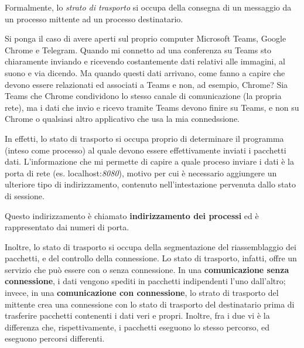             Formalmente, lo \textit{strato di trasporto} si occupa della consegna di un messaggio da un processo mittente ad un processo destinatario. 
            
            \vspace{3mm}
            
            Si ponga il caso di avere aperti sul proprio computer Microsoft Teams, Google Chrome e Telegram. Quando mi connetto ad una conferenza su Teams sto chiaramente inviando e ricevendo costantemente dati relativi alle immagini, al suono e via dicendo. Ma quando questi dati arrivano, come fanno a capire che devono essere relazionati ed associati a Teams e non, ad esempio, Chrome? Sia Teams che Chrome condividono lo stesso canale di comunicazione (la propria rete), ma i dati che invio e ricevo tramite Teams devono finire su Teams, e non su Chrome o qualsiasi altro applicativo che usa la mia connedssione.
            
            \vspace{3mm}
            
            In effetti, lo stato di trasporto si occupa proprio di determinare il programma (inteso come processo) al quale devono essere effettivamente inviati i pacchetti dati. L'informazione che mi permette di capire a quale proceso inviare i dati è la porta di rete (es. localhost:\textit{8080}), motivo per cui è necessario aggiungere un ulteriore tipo di indirizzamento, contenuto nell'intestazione pervenuta dallo stato di sessione.
            
            \vspace{3mm}
            
            Questo indirizzamento è chiamato \textbf{indirizzamento dei processi} ed è rappresentato dai numeri di porta.
            
            \vspace{3mm}
            
            Inoltre, lo stato di trasporto si occupa della segmentazione del riassemblaggio dei pacchetti, e del controllo della connessione. Lo stato di trasporto, infatti, offre un servizio che può essere con o senza connessione. In una \textbf{comunicazione senza connessione}, i dati vengono spediti in pacchetti indipendenti l'uno dall'altro; invece, in una \textbf{comunicazione con connessione}, lo strato di trasporto del mittente crea una connessione con lo stato di trasporto del destinatario prima di trasferire pacchetti contenenti i dati veri e propri. Inoltre, fra i due vi è la differenza che, rispettivamente, i pacchetti eseguono lo stesso percorso, ed eseguono percorsi differenti.
            

